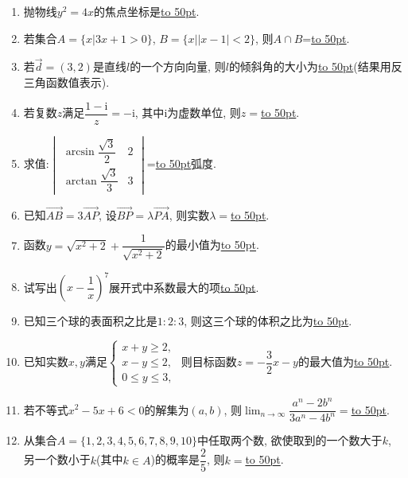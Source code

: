 \documentclass[10pt,a4paper]{article}
\newcommand{\blank}[1]{\underline{\hbox to #1pt{}}}
\begin{document}
\begin{enumerate}[1.]
\item 抛物线$y^2=4x$的焦点坐标是\blank{50}.
\item 若集合$A=\{x|3x+1>0\}$, $B=\{x||x-1|<2\}$, 则$A\cap B$=\blank{50}.
\item 若$\overrightarrow d=(3,2)$是直线$l$的一个方向向量, 则$l$的倾斜角的大小为\blank{50}(结果用反三角函数值表示).
\item 若复数$z$满足$\dfrac{1-\mathrm{i}}z=-\mathrm{i}$, 其中$\mathrm{i}$为虚数单位, 则$z=$\blank{50}.
\item 求值:$\begin{vmatrix}\arcsin\dfrac{\sqrt3}2 & 2  \\ \arctan\dfrac{\sqrt3}3 & 3  \end{vmatrix}$=\blank{50}弧度.
\item 已知$\overrightarrow{AB}=3\overrightarrow{AP}$, 设$\overrightarrow{BP}=\lambda \overrightarrow{PA}$, 则实数$\lambda=$\blank{50}.
\item 函数$y=\sqrt{x^2+2}+\dfrac1{\sqrt{x^2+2}}$的最小值为\blank{50}.
\item 试写出$(x-\dfrac1x)^7$展开式中系数最大的项\blank{50}.
\item 已知三个球的表面积之比是$1:2:3$, 则这三个球的体积之比为\blank{50}.
\item 已知实数$x,y$满足$\begin{cases}x+y\ge 2, \\ x-y\le 2, \\ 0 \le y\le 3, \end{cases}$ 则目标函数$z=-\dfrac32x-y$的最大值为\blank{50}.
\item 若不等式$x^2-5x+6<0$的解集为$(a,b)$, 则$\displaystyle\lim_{n\to\infty}\dfrac{a^n-2b^n}{3a^n-4b^n}=$\blank{50}.
\item 从集合$A=\{1,2,3,4,5,6,7,8,9,10\}$中任取两个数, 欲使取到的一个数大于$k$, 另一个数小于$k$(其中$k\in A$)的概率是$\dfrac25$, 则$k=$\blank{50}.



\end{enumerate}
\end{document}
